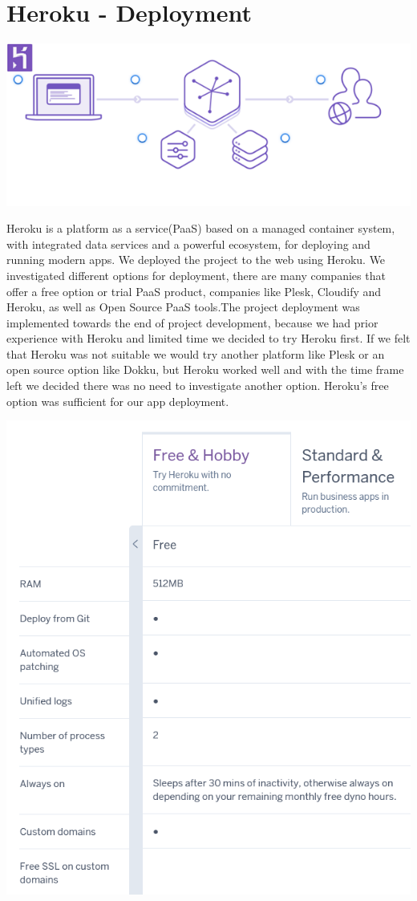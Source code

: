 \section{Heroku - Deployment}
\begin{center}
      \includegraphics{img/HerokuArchitecture.png}
\end{center}
Heroku is a platform as a service(PaaS) based on a managed container system, with integrated data services and a powerful ecosystem, for deploying and running modern apps.\cite{heroku}
We deployed the project to the web using Heroku. We investigated different options for deployment, there are many companies that offer a free option or trial PaaS product, companies like Plesk, Cloudify and Heroku, as well as Open Source PaaS tools.The project deployment was implemented towards the end of project development, because we had prior experience with Heroku and limited time we decided to try Heroku first. If we felt that Heroku was not suitable we would try another platform like Plesk or an open source option like Dokku, but Heroku worked well and with the time frame left we decided there was no need to investigate another option. Heroku's free option was sufficient for our app deployment.
\begin{center}
      \includegraphics[scale=0.6]{img/HerokuStats.PNG}
\end{center}

